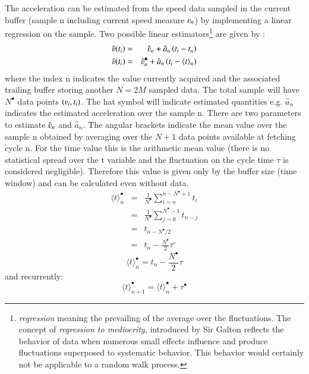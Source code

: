 The acceleration can be estimated from the speed data sampled in the current buffer (sample n including current speed measure $\varv_n$) by implementing a linear regression on the sample.
Two possible linear estimators\footnote{\emph{regression} meaning the prevailing of the average over the fluctuations. The concept of \emph{regression to mediocrity}, introduced by Sir Galton reflects the behavior of data when numerous small effects influence and produce fluctuations superposed to systematic behavior. This behavior would certainly not be applicable to a random walk process.} are given by :
\begin{eqnarray}
\hat{\varv}(t_i) &=&\hat{\varv}_n+\hat{a}_n\left(t_i-t_n\right)\label{fig:lin_est1}\\
\hat{\varv}(t_i) &=&\hat{\varv}^{\spadesuit}_n+\hat{a}_n\left(t_i-\langle t \rangle_n\right) \label{fig:lin_est2}
\end{eqnarray}
where the index n indicates the value currently acquired and the associated trailing buffer storing another $N=2M$ sampled data. The total sample will have $N^\bullet$ data points $(\varv_i,t_i)$. The hat symbol will indicate estimated quantities e.g. $\hat{a}_n$ indicates the estimated acceleration over the sample n. There are two parameters to estimate $\hat{\varv}_n$ and $\hat{a}_n$.  The angular brackets indicate the mean value over the sample n obtained by averaging over the $N+1$ data points available at fetching cycle n. For the time value this is the arithmetic mean value (there is no statistical spread over the t variable and the fluctuation on the cycle time $\tau$ is considered negligible). Therefore this value is given only by the buffer size (time window) and can be calculated even without data.
\begin{eqnarray}
\langle t \rangle^\bullet_n &=& \frac{1}{N^\bullet}\sum\limits_{i=n}^{n-N^\bullet+1} t_i \nonumber \\ 
&=& \frac{1}{N^\bullet}\sum\limits_{j=0}^{N^\bullet-1} t_{n-j} \nonumber \\ 
&=& t_{n-N^\bullet/2} \nonumber\\
&=&  t_n-\frac{N^\bullet}{2}\tau^\circ
\label{eq:mean_delay}
\end{eqnarray}
\begin{equation}
\boxed{
\langle t \rangle^\bullet_n = t_n-\frac{N^\bullet}{2}\tau
}
\end{equation}
and recurrently:
\begin{equation}
\langle t \rangle^\bullet_{n+1} = \langle t \rangle^\bullet_{n} +\tau^\bullet
\end{equation}

